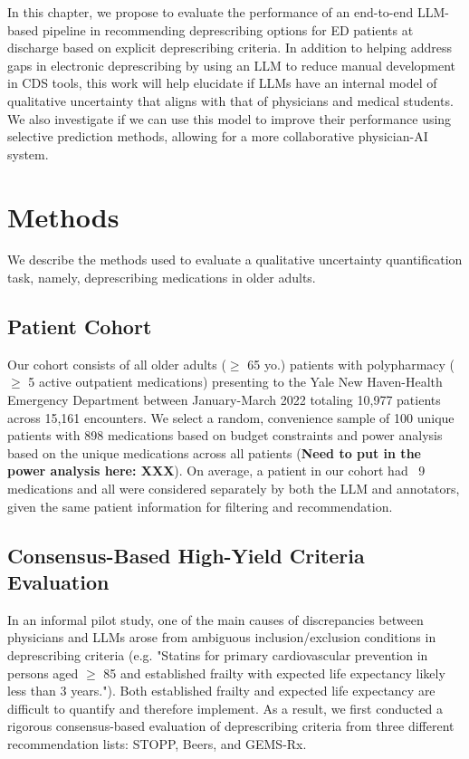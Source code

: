 In this chapter, we propose to evaluate the performance of an end-to-end LLM-based pipeline in recommending deprescribing options for ED patients at discharge based on explicit deprescribing criteria. In addition to helping address gaps in electronic deprescribing by using an LLM to reduce manual development in CDS tools, this work will  help elucidate if LLMs have an internal model of qualitative uncertainty that aligns with that of physicians and medical students. We also investigate if we can use this model to improve their performance using selective prediction methods, allowing for a more collaborative physician-AI system.

\section{Methods}

We describe the methods used to evaluate a qualitative uncertainty quantification task, namely, deprescribing  medications in older adults. 

\subsection{Patient Cohort}

Our cohort consists of all older adults ($\geq$ 65 yo.) patients with polypharmacy ($\geq$ 5 active outpatient medications) presenting to the Yale New Haven-Health Emergency Department between January-March 2022 totaling 10,977 patients across 15,161 encounters. We select a random, convenience sample of 100 unique patients with 898 medications based on budget constraints and power analysis based on the unique medications across all patients (\textbf{Need to put in the power analysis here: XXX}). On average, a patient in our cohort had ~9 medications and all were considered separately by both the LLM and annotators, given the same patient information for filtering and recommendation. 

\subsection{Consensus-Based High-Yield Criteria Evaluation}

In an informal pilot study, one of the main causes of discrepancies between physicians and LLMs arose from ambiguous inclusion/exclusion conditions in deprescribing criteria (e.g. "Statins for primary cardiovascular prevention in persons aged $\geq$ 85 and established frailty with expected life expectancy likely less than 3 years."). Both established frailty and expected life expectancy are difficult to quantify and therefore implement. As a result, we first conducted a rigorous consensus-based evaluation of deprescribing criteria from three different recommendation lists: STOPP, Beers, and GEMS-Rx. 

